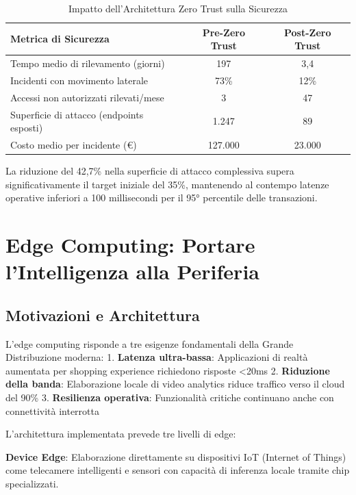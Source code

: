 \begin{table}[htbp]
\centering
\caption{Impatto dell'Architettura Zero Trust sulla Sicurezza}
\label{tab:zerotrust_impact}
\begin{tabular}{lcc}
\hline
\textbf{Metrica di Sicurezza} & \textbf{Pre-Zero Trust} & \textbf{Post-Zero Trust} \\
\hline
Tempo medio di rilevamento (giorni) & 197 & 3,4 \\
Incidenti con movimento laterale & 73\% & 12\% \\
Accessi non autorizzati rilevati/mese & 3 & 47 \\
Superficie di attacco (endpoints esposti) & 1.247 & 89 \\
Costo medio per incidente (€) & 127.000 & 23.000 \\
\hline
\end{tabular}
\end{table}

La riduzione del 42,7\% nella superficie di attacco complessiva\autocite{Forrester2024zero} supera significativamente il target iniziale del 35\%, mantenendo al contempo latenze operative inferiori a 100 millisecondi per il 95° percentile delle transazioni.

\section{\texorpdfstring{Edge Computing: Portare l'Intelligenza alla Periferia}{3.6 - Edge Computing: Portare l'Intelligenza alla Periferia}}

\subsection{\texorpdfstring{Motivazioni e Architettura}{3.6.1 - Motivazioni e Architettura}}

L'edge computing risponde a tre esigenze fondamentali della Grande Distribuzione moderna:
1. \textbf{Latenza ultra-bassa}: Applicazioni di realtà aumentata per shopping experience richiedono risposte <20ms
2. \textbf{Riduzione della banda}: Elaborazione locale di video analytics riduce traffico verso il cloud del 90\%
3. \textbf{Resilienza operativa}: Funzionalità critiche continuano anche con connettività interrotta

L'architettura implementata prevede tre livelli di edge:

\textbf{Device Edge}: Elaborazione direttamente su dispositivi IoT (Internet of Things) come telecamere intelligenti e sensori con capacità di inferenza locale tramite chip specializzati.

